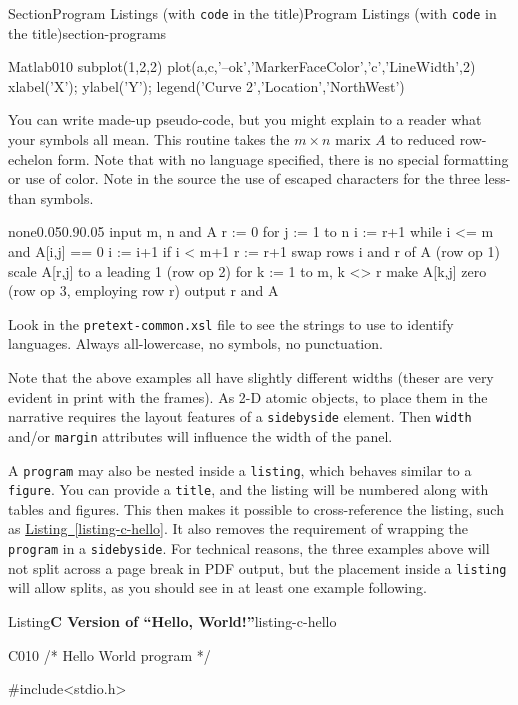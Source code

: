 \documentclass[twoside,10pt,]{article}
\newcommand{\xreffont}{\relax}
\newcommand{\mono}[1]{\texttt{#1}}
\numberwithin{equation}{section}
\begin{document}
\begin{sectionptx}{Section}{Program Listings (with \mono{code} in the title)}{}{Program Listings (with \mono{code} in the title)}{}{}{section-programs}
\begin{program}{Matlab}{0}{1}{0}
subplot(1,2,2)
plot(a,c,'--ok','MarkerFaceColor','c','LineWidth',2)
xlabel('X'); ylabel('Y'); legend('Curve 2','Location','NorthWest')
\end{program}
You can write made-up pseudo-code, but you might explain to a reader what your symbols all mean.  This routine takes the \(m\times n\) marix \(A\) to reduced row-echelon form.  Note that with no language specified, there is no special formatting or use of color.  Note in the source the use of escaped characters for the three less-than symbols.%
\begin{program}{none}{0.05}{0.9}{0.05}
input m, n and A
r := 0
for j := 1 to n
   i := r+1
   while i <= m and A[i,j] == 0
       i := i+1
   if i < m+1
       r := r+1
       swap rows i and r of A (row op 1)
       scale A[r,j] to a leading 1 (row op 2)
       for k := 1 to m, k <> r
           make A[k,j] zero (row op 3, employing row r)
output r and A
\end{program}
Look in the \mono{pretext-common.xsl} file to see the strings to use to identify languages.  Always all-lowercase, no symbols, no punctuation.%
\par
Note that the above examples all have slightly different widths (theser are very evident in print with the frames).  As 2-D atomic objects, to place them in the narrative requires the layout features of a \mono{sidebyside} element.  Then \mono{width} and\slash{}or \mono{margin} attributes will influence the width of the panel.%
\par
A \mono{program} may also be nested inside a \mono{listing}, which behaves similar to a \mono{figure}.  You can provide a \mono{title}, and the listing will be numbered along with tables and figures.  This then makes it possible to cross-reference the listing, such as \hyperref[listing-c-hello]{Listing~{\xreffont\ref{listing-c-hello}}}.  It also removes the requirement of wrapping the \mono{program} in a \mono{sidebyside}.  For technical reasons, the three examples above will not split across a page break in PDF output, but the placement inside a \mono{listing} will allow splits, as you should see in at least one example following.%
\begin{listingptx}{Listing}{\textbf{C Version of ``Hello, World!''}}{listing-c-hello}{}%
\begin{program}{C}{0}{1}{0}
/* Hello World program */

#include<stdio.h>


\end{program}
\end{listingptx}
\end{sectionptx}
\end{document}
